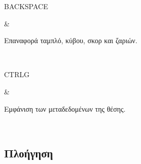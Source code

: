 \documentclass[letterpaper,10pt,greek]{sphinxmanual}
\begin{document}
\begin{savenotes}
\begin{tabular}[t]{}
\begin{varwidth}[t]{}
\sphinxAtStartPar
BACKSPACE
\sphinxbeforeendvarwidth
\end{varwidth}%
&\begin{varwidth}[t]{}
\sphinxAtStartPar
Επαναφορά ταμπλό, κύβου, σκορ και ζαριών.
\sphinxbeforeendvarwidth
\end{varwidth}%
\\
\sphinxhline\begin{varwidth}[t]{}
\sphinxAtStartPar
CTRL\sphinxhyphen{}G
\sphinxbeforeendvarwidth
\end{varwidth}%
&\begin{varwidth}[t]{}
\sphinxAtStartPar
Εμφάνιση των μεταδεδομένων της θέσης.
\sphinxbeforeendvarwidth
\end{varwidth}%
\\
\sphinxbottomrule
\end{tabular}
\sphinxtableafterendhook\par
\sphinxattableend\end{savenotes}


\subsection{Πλοήγηση}
\label{\detokenize{raccourcis:navigation}}\label{\detokenize{raccourcis:raccourcis-navigation}}
\end{document}
